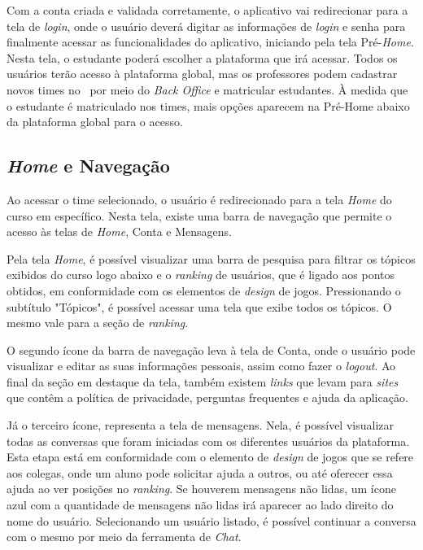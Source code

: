 Com a conta criada e validada corretamente, o aplicativo vai redirecionar para a tela de \textit{login}, onde o usuário deverá digitar as informações de \textit{login} e senha para finalmente acessar as funcionalidades do aplicativo, iniciando pela tela Pré-\textit{Home}. Nesta tela, o estudante poderá escolher a plataforma que irá acessar. Todos os usuários terão acesso à plataforma global, mas os professores podem cadastrar novos times no \appName\ por meio do \textit{Back Office} e matricular estudantes. À medida que o estudante é matriculado nos times, mais opções aparecem na Pré-Home abaixo da plataforma global para o acesso.

\subsection{\textit{Home} e Navegação}
\label{home_navegacao}

Ao acessar o time selecionado, o usuário é redirecionado para a tela \textit{Home} do curso em específico. Nesta tela, existe uma barra de navegação que permite o acesso às telas de \textit{Home}, Conta e Mensagens.


Pela tela \textit{Home}, é possível visualizar uma barra de pesquisa para filtrar os tópicos exibidos do curso logo abaixo e o \textit{ranking} de usuários, que é ligado aos pontos obtidos, em conformidade com os elementos de \textit{design} de jogos. Pressionando o subtítulo "Tópicos", é possível acessar uma tela que exibe todos os tópicos. O mesmo vale para a seção de \textit{ranking}.

O segundo ícone da barra de navegação leva à tela de Conta, onde o usuário pode visualizar e editar as suas informações pessoais, assim como fazer o \textit{logout}. Ao final da seção em destaque da tela, também existem \textit{links} que levam para \textit{sites} que contêm a política de privacidade, perguntas frequentes e ajuda da aplicação.

Já o terceiro ícone, representa a tela de mensagens. Nela, é possível visualizar todas as conversas que foram iniciadas com os diferentes usuários da plataforma. Esta etapa está em conformidade com o elemento de \textit{design} de jogos que se refere aos colegas, onde um aluno pode solicitar ajuda a outros, ou até oferecer essa ajuda ao ver posições no \textit{ranking}. Se houverem mensagens não lidas, um ícone azul com a quantidade de mensagens não lidas irá aparecer ao lado direito do nome do usuário. Selecionando um usuário listado, é possível continuar a conversa com o mesmo por meio da ferramenta de \textit{Chat}.

